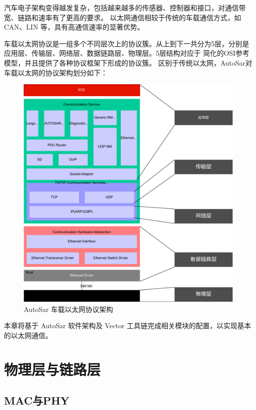 汽车电子架构变得越发复杂，包括越来越多的传感器、控制器和接口，对通信带宽、链路和速率有了更高的要求。
以太网通信相较于传统的车载通信方式，如 CAN、LIN 等，具有高通信速率的显著优势。


车载以太网协议是一组多个不同层次上的协议簇。从上到下一共分为5层，分别是应用层、传输层、网络层、数据链路层、物理层。5层结构对应于 简化的OSI参考模型，并且提供了各种协议框架下形成的协议簇。
区别于传统以太网，AutoSar对车载以太网的协议架构划分如下：

\begin{figure}[ht]
    \centering
    \includegraphics[scale=0.6]{pic/eth_layer.pdf}
    \caption{AutoSar 车载以太网协议架构}
    \label{fig:autosar_eth_layer}
\end{figure}

本章将基于 AutoSar 软件架构及 Vector 工具链完成相关模块的配置，以实现基本的以太网通信。

\section{物理层与链路层}

\subsection{MAC与PHY}

